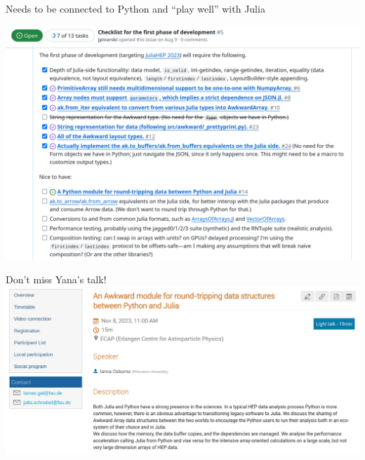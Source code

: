 \documentclass[aspectratio=169]{beamer}
\begin{document}
\begin{frame}{Needs to be connected to Python and ``play well'' with Julia}
\vspace{0.1 cm}
\begin{center}
\includegraphics[width=0.85\linewidth]{issue-5.png}
\end{center}
\end{frame}

\begin{frame}{Don't miss Yana's talk!}
\vspace{0.5 cm}
\includegraphics[width=\linewidth]{ianna-lightning-talk.png}
\end{frame}
\end{document}
